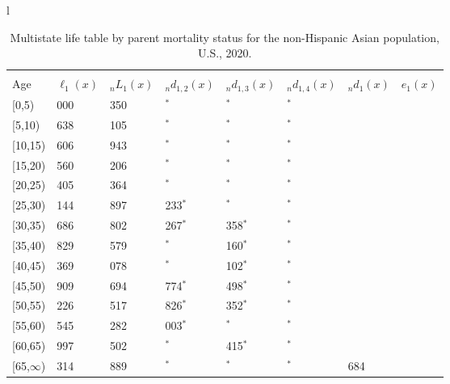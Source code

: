 \documentclass[
]{article}
\begin{document}
\begin{table}
\caption{\label{tab:table-nhasian}Multistate life table by parent mortality status for the non-Hispanic Asian population, U.S., 2020.}

\centering
\fontsize{9}{11}\selectfont
\begin{tabular}[t]{l}
\hline
\begin{tabular}{>{\raggedright\arraybackslash}p{.45in}>{\raggedleft\arraybackslash}p{.65in}>{\raggedleft\arraybackslash}p{.65in}>{\raggedleft\arraybackslash}p{.65in}>{\raggedleft\arraybackslash}p{.65in}>{\raggedleft\arraybackslash}p{.65in}>{\raggedleft\arraybackslash}p{.65in}>{\raggedleft\arraybackslash}p{.65in}}
\toprule
\multicolumn{1}{c}{ } & \multicolumn{7}{c}{(1) Lost neither} \\
\cmidrule(l{3pt}r{3pt}){2-8}
Age & $\ell_{1}(x)$ & ${}_nL_{1}(x)$ & ${}_nd_{1,2}(x)$ & ${}_nd_{1,3}(x)$ & ${}_nd_{1,4}(x)$ & ${}_nd_{1}(x)$ & $e_{1}(x)$\\
\midrule
{}[0,5) & 100 000 & 498 350 & 0$^{*}$ & 0$^{*}$ & 0$^{*}$ & 362 & 48\\
{}[5,10) & 99 638 & 498 105 & 0$^{*}$ & 0$^{*}$ & 0$^{*}$ & 32 & 43\\
{}[10,15) & 99 606 & 497 943 & 0$^{*}$ & 0$^{*}$ & 0$^{*}$ & 47 & 38\\
{}[15,20) & 99 560 & 482 206 & 0$^{*}$ & 0$^{*}$ & 0$^{*}$ & 155 & 33\\
{}[20,25) & 99 405 & 489 364 & 0$^{*}$ & 0$^{*}$ & 0$^{*}$ & 261 & 28\\
\addlinespace
{}[25,30) & 99 144 & 451 897 & 7 233$^{*}$ & 0$^{*}$ & 0$^{*}$ & 225 & 24\\
{}[30,35) & 91 686 & 415 802 & 7 267$^{*}$ & 1 358$^{*}$ & 0$^{*}$ & 233 & 19\\
{}[35,40) & 82 829 & 423 579 & 0$^{*}$ & 2 160$^{*}$ & 0$^{*}$ & 300 & 15\\
{}[40,45) & 80 369 & 364 078 & 0$^{*}$ & 2 102$^{*}$ & 0$^{*}$ & 358 & 11\\
{}[45,50) & 77 909 & 259 694 & 4 774$^{*}$ & 3 498$^{*}$ & 0$^{*}$ & 411 & 7\\
\addlinespace
{}[50,55) & 69 226 & 197 517 & 3 826$^{*}$ & 5 352$^{*}$ & 0$^{*}$ & 503 & 4\\
{}[55,60) & 59 545 & 144 282 & 18 003$^{*}$ & 0$^{*}$ & 0$^{*}$ & 545 & 2\\
{}[60,65) & 40 997 & 44 502 & 0$^{*}$ & 3 415$^{*}$ & 0$^{*}$ & 268 & 1\\
{}[65,$\infty$) & 37 314 & 36 889 & 0$^{*}$ & 0$^{*}$ & 0$^{*}$ & 1 684 & 0\\

\end{tabular}
\end{tabular}
\end{table}
\end{document}
